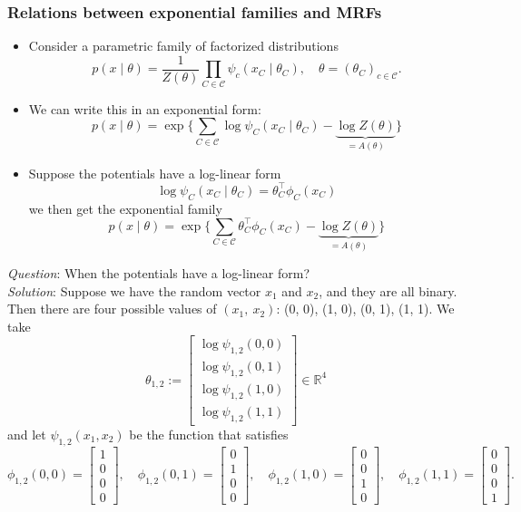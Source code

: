 \subsubsection*{Relations between exponential families and MRFs}
\begin{itemize}
  \item Consider a parametric family of factorized distributions
  $$
  p(x \mid \theta)=\frac{1}{Z(\theta)} \prod_{C \in \mathcal{C}} \psi_c\left(x_C \mid \theta_C\right), \quad \theta=\left(\theta_C\right)_{c \in \mathcal{C}} .
  $$
  \item We can write this in an exponential form:
  $$
  p(x \mid \theta)=\exp \{\sum_{C \in \mathcal{C}} \log \psi_C\left(x_C \mid \theta_C\right)-\underbrace{\log Z(\theta)}_{=A(\theta)}\}
  $$
  \item Suppose the potentials have a log-linear form
  $$
  \log \psi_C\left(x_C \mid \theta_C\right)=\theta_C^{\top} \phi_C\left(x_C\right)
  $$
  we then get the exponential family
  $$
  p(x \mid \theta)=\exp \{\sum_{C \in \mathcal{C}} \theta_C^{\top} \phi_C\left(x_C\right)-\underbrace{\log Z(\theta)}_{=A(\theta)}\}
  $$
\end{itemize}
\textit{Question}: When the potentials have a log-linear form?\\
\textit{Solution}: Suppose we have the random vector $x_1$ and $x_2$, and they are all binary. Then there are four possible values of $(x_1,\:x_2)$: (0, 0), (1, 0), (0, 1), (1, 1). We take\\
$$
\theta_{1,2}:=\left[\begin{array}{l}
\log \psi_{1,2}(0,0) \\
\log \psi_{1,2}(0,1) \\
\log \psi_{1,2}(1,0) \\
\log \psi_{1,2}(1,1)
\end{array}\right] \in \mathbb{R}^4
$$
and let $\psi_{1,2}\left(x_1, x_2\right)$ be the function that satisfies
$$
\phi_{1,2}(0,0)=\left[\begin{array}{l}
1 \\
0 \\
0 \\
0
\end{array}\right], \quad \phi_{1,2}(0,1)=\left[\begin{array}{l}
0 \\
1 \\
0 \\
0
\end{array}\right], \quad \phi_{1,2}(1,0)=\left[\begin{array}{l}
0 \\
0 \\
1 \\
0
\end{array}\right], \quad \phi_{1,2}(1,1)=\left[\begin{array}{l}
0 \\
0 \\
0 \\
1
\end{array}\right].
$$

